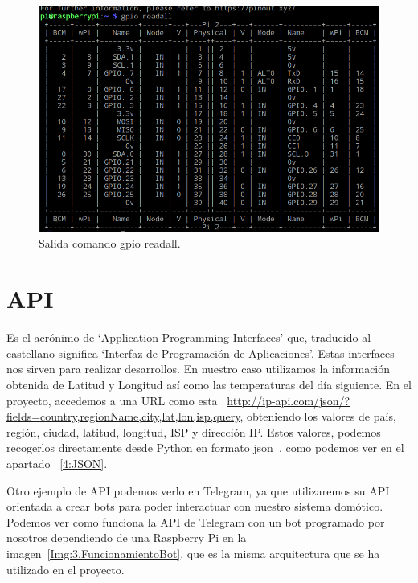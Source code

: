 \begin{figure}[h]
    \centering
    \includegraphics[width=.84\textwidth]{img/fotos/gpioReadall.png}
    \caption[Salida comando gpio readall]{Salida comando gpio readall.} \label{Img:3.GPIOReadAll}
\end{figure}


\section{API}\label{concepto:API}
Es el acrónimo de ‘Application Programming Interfaces’ que, traducido al castellano significa ‘Interfaz de Programación de Aplicaciones’. Estas interfaces nos sirven para realizar desarrollos. En nuestro caso utilizamos la información obtenida de Latitud y Longitud así como las temperaturas del día siguiente.
En el proyecto, accedemos a una URL como esta ~\url{http://ip-api.com/json/?fields=country,regionName,city,lat,lon,isp,query}, obteniendo los valores de país, región, ciudad, latitud, longitud, ISP y dirección IP.
Estos valores, podemos recogerlos directamente desde Python en formato json~\cite{misc:Json}, como podemos ver en el apartado ~\ref{4:JSON}.

Otro ejemplo de API podemos verlo en Telegram, ya que utilizaremos su API orientada a crear bots para poder interactuar con nuestro sistema domótico. Podemos ver como funciona la API de Telegram con un bot programado por nosotros dependiendo de una Raspberry Pi en la imagen~\ref{Img:3.FuncionamientoBot}, que es la misma arquitectura que se ha utilizado en el proyecto.

